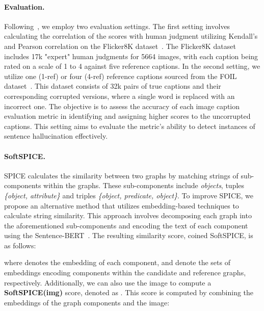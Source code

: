 \paragraph{Evaluation.} Following~\citet{hessel2021clipscore}, we employ two evaluation settings. The first setting involves calculating the correlation of the scores with human judgment utilizing Kendall's  and Pearson correlation on the Flicker8K dataset~\cite{hodosh2013framing}. The Flicker8K dataset includes 17k "expert" human judgments for 5664 images, with each caption being rated on a scale of 1 to 4 against five reference captions. In the second setting, we utilize one (1-ref) or four (4-ref) reference captions sourced from the FOIL dataset~\cite{shekhar2017foil}. This dataset consists of 32k pairs of true captions and their corresponding corrupted versions, where a single word is replaced with an incorrect one. The objective is to assess the accuracy of each image caption evaluation metric in identifying and assigning higher scores to the uncorrupted captions. This setting aims to evaluate the metric's ability to detect instances of sentence hallucination effectively.


\paragraph{SoftSPICE.} SPICE calculates the similarity between two graphs by matching strings of sub-components within the graphs. These sub-components include \textit{objects}, tuples \textit{\{object, attribute\}} and triples \textit{\{object, predicate, object\}}. To improve SPICE, we propose an alternative method that utilizes embedding-based techniques to calculate string similarity. This approach involves decomposing each graph into the aforementioned sub-components and encoding the text of each component using the Sentence-BERT~\cite{reimers2019sentence}. The resulting similarity score, coined SoftSPICE, is as follows:

\begin{small}

\end{small}
\noindent where  denotes the embedding of each component,  and  denote the sets of embeddings encoding components within the candidate and reference graphs, respectively. Additionally, we can also use the image  to compute a \textbf{SoftSPICE(img)} score, denoted as . This score is computed by combining the embeddings of the graph components and the image:

\vspace{-2mm}
\begin{small}

\end{small}

